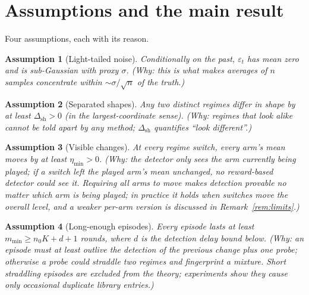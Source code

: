 \documentclass[11pt]{article}
\newtheorem{assumption}{Assumption}
\newcommand{\dsh}{\Delta_{\mathrm{sh}}}
\begin{document}
\section{Assumptions and the main result}

Four assumptions, each with its reason.

\begin{assumption}[Light-tailed noise]
\label{ass:noise}
Conditionally on the past, $\varepsilon_t$ has mean zero and is sub-Gaussian with proxy $\sigma$.
\emph{(Why: this is what makes averages of $n$ samples concentrate within $\sim\sigma/\sqrt n$ of the truth.)}
\end{assumption}

\begin{assumption}[Separated shapes]
\label{ass:sep}
Any two distinct regimes differ in shape by at least $\dsh>0$ (in the largest-coordinate sense).
\emph{(Why: regimes that look alike cannot be told apart by any method; $\dsh$ quantifies ``look different''.)}
\end{assumption}

\begin{assumption}[Visible changes]
\label{ass:vis}
At every regime switch, \emph{every} arm's mean moves by at least $\eta_{\min}>0$.
\emph{(Why: the detector only sees the arm currently being played; if a switch left the played arm's mean unchanged, no reward-based detector could see it. Requiring all arms to move makes detection provable no matter which arm is being played; in practice it holds when switches move the overall level, and a weaker per-arm version is discussed in Remark~\ref{rem:limits}.)}
\end{assumption}

\begin{assumption}[Long-enough episodes]
\label{ass:dwell}
Every episode lasts at least $m_{\min}\ge n_0K+d+1$ rounds, where $d$ is the detection delay bound below.
\emph{(Why: an episode must at least outlive the detection of the previous change plus one probe; otherwise a probe could straddle two regimes and fingerprint a mixture. Short straddling episodes are excluded from the theory; experiments show they cause only occasional duplicate library entries.)}
\end{assumption}
\end{document}
